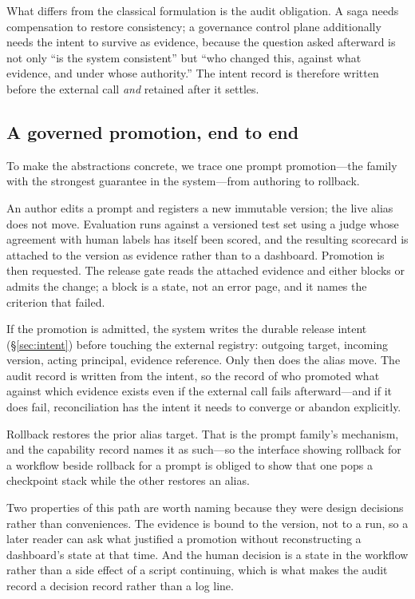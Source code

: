\documentclass{article}
\begin{document}
What differs from the classical formulation is the audit obligation. A saga needs
compensation to restore consistency; a governance control plane additionally needs
the intent to survive as evidence, because the question asked afterward is not only
``is the system consistent'' but ``who changed this, against what evidence, and
under whose authority.'' The intent record is therefore written before the external
call \emph{and} retained after it settles.

\subsection{A governed promotion, end to end}

To make the abstractions concrete, we trace one prompt promotion---the family with
the strongest guarantee in the system---from authoring to rollback.

An author edits a prompt and registers a new immutable version; the live alias does
not move. Evaluation runs against a versioned test set using a judge whose
agreement with human labels has itself been scored, and the resulting scorecard is
attached to the version as evidence rather than to a dashboard. Promotion is then
requested. The release gate reads the attached evidence and either blocks or admits
the change; a block is a state, not an error page, and it names the criterion that
failed.

If the promotion is admitted, the system writes the durable release intent
(\S\ref{sec:intent}) before touching the external registry: outgoing target,
incoming version, acting principal, evidence reference. Only then does the alias
move. The audit record is written from the intent, so the record of who promoted
what against which evidence exists even if the external call fails afterward---and
if it does fail, reconciliation has the intent it needs to converge or abandon
explicitly.

Rollback restores the prior alias target. That is the prompt family's mechanism,
and the capability record names it as such---so the interface showing rollback for
a workflow beside rollback for a prompt is obliged to show that one pops a
checkpoint stack while the other restores an alias.

Two properties of this path are worth naming because they were design decisions
rather than conveniences. The evidence is bound to the version, not to a run, so a
later reader can ask what justified a promotion without reconstructing a dashboard's
state at that time. And the human decision is a state in the workflow rather than a
side effect of a script continuing, which is what makes the audit record a decision
record rather than a log line.
\end{document}
